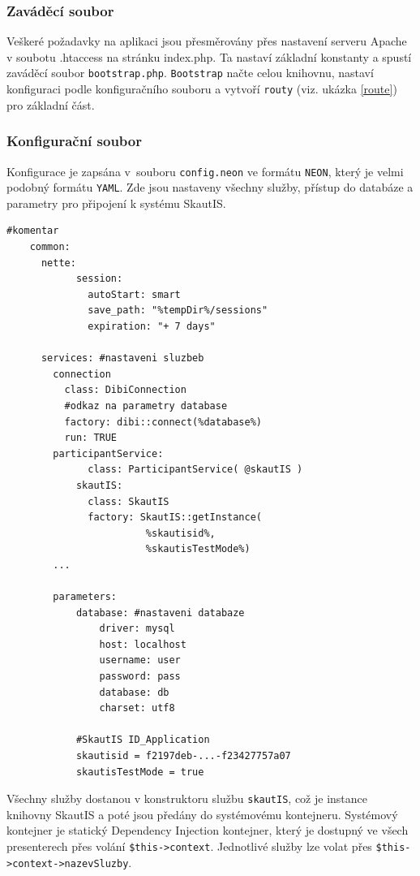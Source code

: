 \documentclass[thesis=B,czech]{FITthesis}[2011/06/14]
\begin{document}
\subsubsection{Zaváděcí soubor}
Veškeré požadavky na aplikaci jsou přesměrovány přes nastavení serveru Apache v soubotu .htaccess na stránku index.php. Ta nastaví základní konstanty a spustí zaváděcí soubor \texttt{bootstrap.php}.
\texttt{Bootstrap} načte celou knihovnu, nastaví konfiguraci podle konfiguračního souboru a vytvoří \texttt{routy} (viz. ukázka \ref{route}) pro základní část.

\subsubsection{Konfigurační soubor}
Konfigurace je zapsána v~souboru \texttt{config.neon} ve formátu \texttt{NEON}\cite{neon}, který je velmi podobný formátu \texttt{YAML}. Zde jsou nastaveny všechny služby, přístup do databáze a parametry pro připojení k systému SkautIS.

\begin{lstlisting}[caption=ukázka z konfiguračního souboru config.neon]
	#komentar
	common:
	  nette:
            session:
              autoStart: smart
              save_path: "%tempDir%/sessions"
              expiration: "+ 7 days"
           
	  services: #nastaveni sluzbeb
	    connection
	      class: DibiConnection
	      #odkaz na parametry database
	      factory: dibi::connect(%database%)
	      run: TRUE
	    participantService:
              class: ParticipantService( @skautIS )
            skautIS:
              class: SkautIS
              factory: SkautIS::getInstance(
              			%skautisid%,
              			%skautisTestMode%)
	    ...
	
	    parameters:
	        database: #nastaveni databaze
	            driver: mysql
	            host: localhost
	            username: user
	            password: pass
	            database: db
	            charset: utf8
	
	        #SkautIS ID_Application
	        skautisid = f2197deb-...-f23427757a07
	        skautisTestMode = true
\end{lstlisting}

Všechny služby dostanou v konstruktoru službu \texttt{skautIS}, což je instance knihovny SkautIS a poté jsou předány do systémovému kontejneru. Systémový kontejner je statický Dependency Injection\cite{di} kontejner, který je dostupný ve všech presenterech přes volání \texttt{\$this->context}. Jednotlivé služby lze volat přes \texttt{\$this->context->nazevSluzby}.
\end{document}
